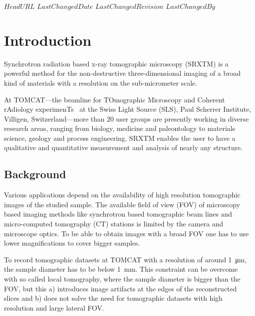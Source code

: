 \svnidlong
{$HeadURL$}
{$LastChangedDate$}
{$LastChangedRevision$}
{$LastChangedBy$}

\begin{center}
\end{center}

\section{Introduction}
Synchrotron radiation based x-ray tomographic microscopy (SRXTM) is a powerful method for the non-destructive three-dimensional imaging of a broad kind of materials with a resolution on the sub-micrometer scale.

At TOMCAT---the beamline for TOmographic Microscopy and Coherent rAdiology experimenTs~\cite{Stampanoni2007} at the Swiss Light Source (SLS), Paul Scherrer Institute, Villigen, Switzerland---more than 20 user groups are presently working in diverse research areas, ranging from biology, medicine and paleontology to materials science, geology and process engineering. SRXTM enables the user to have a qualitative and quantitative measurement and analysis of nearly any structure.

\subsection{Background}
Various applications depend on the availability of high resolution tomographic images of the studied sample. The available field of view (FOV) of microscopy based imaging methods like synchrotron based tomographic beam lines and micro-computed tomography (\micro CT) stations is limited by the camera and microscope optics. To be able to obtain images with a broad FOV one has to use lower magnifications to cover bigger samples.

To record tomographic datasets at TOMCAT with a resolution of around \SI{1}{\micro\meter}, the sample diameter has to be below \SI{1}{\milli\meter}. This constraint can be overcome with so called local tomography, where the sample diameter is bigger than the FOV, but this a) introduces image artifacts at the edges of the reconstructed slices and b) does not solve the need for tomographic datasets with high resolution and large lateral FOV.

